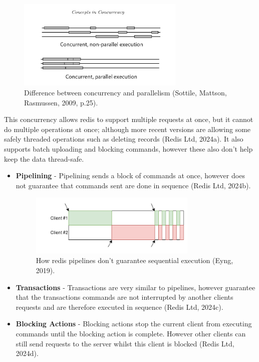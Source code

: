   \begin{figure}[H]
    \centering
    \includegraphics[width=8cm]{assets/concurrecnyVsParallelism.jpg}
    \caption{Difference between concurrency and parallelism (Sottile, Mattson, Rasmussen, 2009, p.25).}
    \label{fig:concurrecnyVsParallelism}
  \end{figure}

  This concurrency allows redis to support multiple requests at once, but it cannot do multiple operations at once; although more recent versions are allowing
  some safely threaded operations such as deleting records (Redis Ltd, 2024a). It also supports batch uploading and blocking commands, however these also 
  don't help keep the data thread-safe.

  \begin{itemize}
    \item \textbf{Pipelining} - Pipelining sends a block of commands at once, however does not guarantee that commands sent are done in sequence 
    (Redis Ltd, 2024b).
    \begin{figure}[H]
      \centering
      \includegraphics[width=8cm]{assets/pipelineOrdering.png}
      \caption{How redis pipelines don't guarantee sequential execution (Eyng, 2019).}
      \label{fig:pipelineOrdering}
    \end{figure}
    \item \textbf{Transactions} - Transactions are very similar to pipelines, however guarantee that the transactions commands are not interrupted by another
    clients requests and are therefore executed in sequence (Redis Ltd, 2024c).
    \item \textbf{Blocking Actions} - Blocking actions stop the current client from executing commands until the blocking action is complete. However other 
    clients can still send requests to the server whilst this client is blocked (Redis Ltd, 2024d). 
  \end{itemize}

